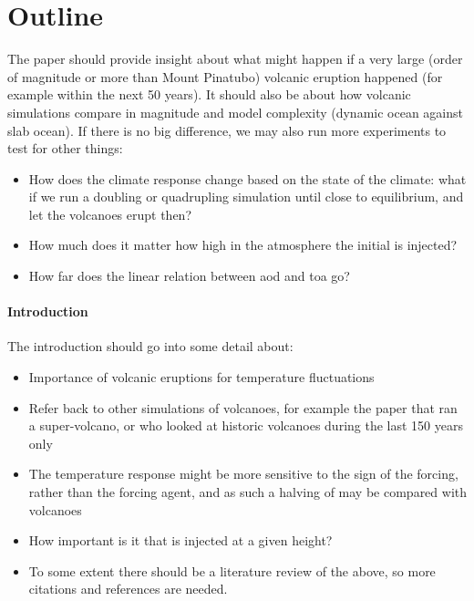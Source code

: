 \documentclass{ametsocV5}
\begin{document}
\section{Outline}

The paper should provide insight about what might happen if a very large (order of
magnitude or more than Mount Pinatubo) volcanic eruption happened (for example within
the next 50 years). It should also be about how volcanic simulations compare in
magnitude and model complexity (dynamic ocean against slab ocean). If there is no big
difference, we may also run more experiments to test for other things:
\begin{itemize}
  \item How does the climate response change based on the state of the climate: what if we run
        a  doubling or quadrupling simulation until close to equilibrium, and let the
        volcanoes erupt then?
  \item How much does it matter how high in the atmosphere the initial  is injected?
  \item How far does the linear relation between \acrshort{aod} and \acrshort{toa} go?
\end{itemize}

\paragraph*{Introduction}

The introduction should go into some detail about:

\begin{itemize}
  \item Importance of volcanic eruptions for temperature fluctuations
  \item Refer back to other simulations of volcanoes, for example the \citet{jones2005} paper
        that ran a super-volcano, or \citet{gregory2016} who looked at historic volcanoes
        during the last 150 years only
  \item The temperature response might be more sensitive to the sign of the forcing, rather
        than the forcing agent, and as such a halving of  may be compared with
        volcanoes \citep{gunther2022}
  \item How important is it that  is injected at a given height?
  \item To some extent there should be a literature review of the above, so more citations and
        references are needed.
\end{itemize}
\end{document}
